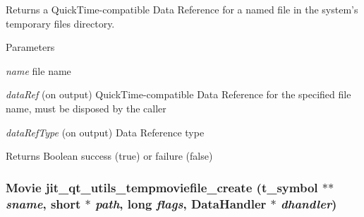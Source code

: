 Returns a QuickTime-\/compatible Data Reference for a named file in the system's temporary files directory. 
\begin{DoxyParams}{Parameters}
\item[{\em name}]file name \item[{\em dataRef}](on output) QuickTime-\/compatible Data Reference for the specified file name, must be disposed by the caller \item[{\em dataRefType}](on output) Data Reference type\end{DoxyParams}
\begin{DoxyReturn}{Returns}
Boolean success (true) or failure (false) 
\end{DoxyReturn}
\hypertarget{group__qtutilsmod_ga715921eb1988d93d1a2c7d13558ba833}{
\subsubsection[{jit\_\-qt\_\-utils\_\-tempmoviefile\_\-create}]{\setlength{\rightskip}{0pt plus 5cm}Movie jit\_\-qt\_\-utils\_\-tempmoviefile\_\-create ({\bf t\_\-symbol} $\ast$$\ast$ {\em sname}, \/  short $\ast$ {\em path}, \/  long {\em flags}, \/  DataHandler $\ast$ {\em dhandler})}}
\label{group__qtutilsmod_ga715921eb1988d93d1a2c7d13558ba833}


